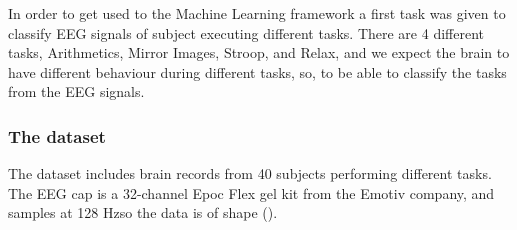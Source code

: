 In order to get used to the Machine Learning framework a first task was given to
classify EEG signals of subject executing different tasks. There are 4 different
tasks, Arithmetics, Mirror Images, Stroop, and Relax, and we expect the brain to
have different behaviour during different tasks, so, to be able to classify the
tasks from the EEG signals.

\subsubsection{The dataset}

The dataset \cite{Ghosh2022} includes brain records from 40 subjects performing
different tasks. The EEG cap is a 32-channel Epoc Flex gel
kit from the Emotiv company, and samples at 128 Hzso the data is of shape ().
